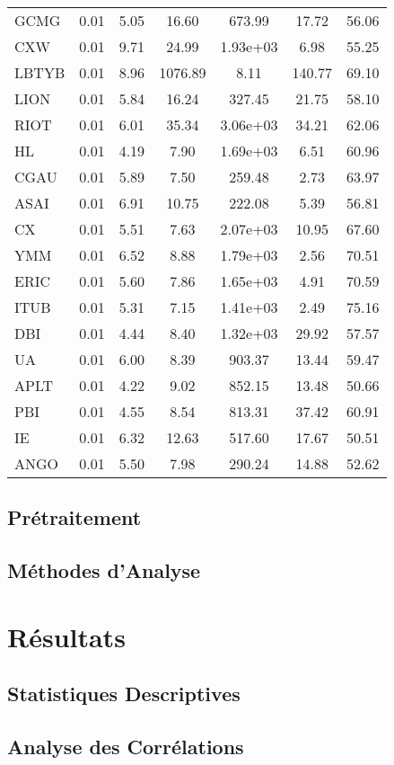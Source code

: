 \documentclass[12pt,a4paper]{article}
\begin{document}
\begin{longtable}{@{}lS[table-format=1.2e-1]S[table-format=1.2e-1]S[table-format=3.2]S[table-format=1.2e+4]S[table-format=1.2]S[table-format=4.2]@{}}
GCMG & 0.01 & 5.05 & 16.60 & 673.99 & 17.72 & 56.06 \\
CXW & 0.01 & 9.71 & 24.99 & 1.93e+03 & 6.98 & 55.25 \\
LBTYB & 0.01 & 8.96 & 1076.89 & 8.11 & 140.77 & 69.10 \\
LION & 0.01 & 5.84 & 16.24 & 327.45 & 21.75 & 58.10 \\
RIOT & 0.01 & 6.01 & 35.34 & 3.06e+03 & 34.21 & 62.06 \\
HL & 0.01 & 4.19 & 7.90 & 1.69e+03 & 6.51 & 60.96 \\
CGAU & 0.01 & 5.89 & 7.50 & 259.48 & 2.73 & 63.97 \\
ASAI & 0.01 & 6.91 & 10.75 & 222.08 & 5.39 & 56.81 \\
CX & 0.01 & 5.51 & 7.63 & 2.07e+03 & 10.95 & 67.60 \\
YMM & 0.01 & 6.52 & 8.88 & 1.79e+03 & 2.56 & 70.51 \\
ERIC & 0.01 & 5.60 & 7.86 & 1.65e+03 & 4.91 & 70.59 \\
ITUB & 0.01 & 5.31 & 7.15 & 1.41e+03 & 2.49 & 75.16 \\
DBI & 0.01 & 4.44 & 8.40 & 1.32e+03 & 29.92 & 57.57 \\
UA & 0.01 & 6.00 & 8.39 & 903.37 & 13.44 & 59.47 \\
APLT & 0.01 & 4.22 & 9.02 & 852.15 & 13.48 & 50.66 \\
PBI & 0.01 & 4.55 & 8.54 & 813.31 & 37.42 & 60.91 \\
IE & 0.01 & 6.32 & 12.63 & 517.60 & 17.67 & 50.51 \\
ANGO & 0.01 & 5.50 & 7.98 & 290.24 & 14.88 & 52.62 \\
\end{longtable}

\subsection{Prétraitement}
\subsection{Méthodes d'Analyse}

\section{Résultats}
\subsection{Statistiques Descriptives}
\subsection{Analyse des Corrélations}
\end{document}
